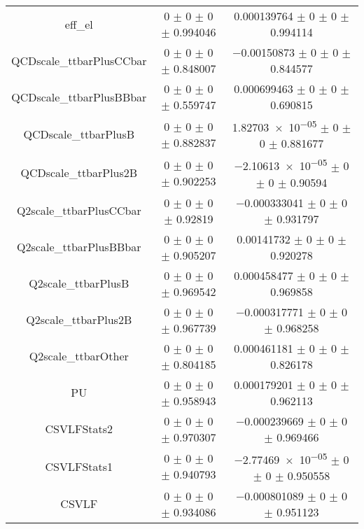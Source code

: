 \begin{table}
\begin{tabular}{ccc}
eff\_el & \num{0} $\pm$ \num{0} $\pm$ \num{0} $\pm$ \num{0.994046} & \num{0.000139764} $\pm$ \num{0} $\pm$ \num{0} $\pm$ \num{0.994114}\\
QCDscale\_ttbarPlusCCbar & \num{0} $\pm$ \num{0} $\pm$ \num{0} $\pm$ \num{0.848007} & \num{-0.00150873} $\pm$ \num{0} $\pm$ \num{0} $\pm$ \num{0.844577}\\
QCDscale\_ttbarPlusBBbar & \num{0} $\pm$ \num{0} $\pm$ \num{0} $\pm$ \num{0.559747} & \num{0.000699463} $\pm$ \num{0} $\pm$ \num{0} $\pm$ \num{0.690815}\\
QCDscale\_ttbarPlusB & \num{0} $\pm$ \num{0} $\pm$ \num{0} $\pm$ \num{0.882837} & \num{1.82703e-05} $\pm$ \num{0} $\pm$ \num{0} $\pm$ \num{0.881677}\\
QCDscale\_ttbarPlus2B & \num{0} $\pm$ \num{0} $\pm$ \num{0} $\pm$ \num{0.902253} & \num{-2.10613e-05} $\pm$ \num{0} $\pm$ \num{0} $\pm$ \num{0.90594}\\
Q2scale\_ttbarPlusCCbar & \num{0} $\pm$ \num{0} $\pm$ \num{0} $\pm$ \num{0.92819} & \num{-0.000333041} $\pm$ \num{0} $\pm$ \num{0} $\pm$ \num{0.931797}\\
Q2scale\_ttbarPlusBBbar & \num{0} $\pm$ \num{0} $\pm$ \num{0} $\pm$ \num{0.905207} & \num{0.00141732} $\pm$ \num{0} $\pm$ \num{0} $\pm$ \num{0.920278}\\
Q2scale\_ttbarPlusB & \num{0} $\pm$ \num{0} $\pm$ \num{0} $\pm$ \num{0.969542} & \num{0.000458477} $\pm$ \num{0} $\pm$ \num{0} $\pm$ \num{0.969858}\\
Q2scale\_ttbarPlus2B & \num{0} $\pm$ \num{0} $\pm$ \num{0} $\pm$ \num{0.967739} & \num{-0.000317771} $\pm$ \num{0} $\pm$ \num{0} $\pm$ \num{0.968258}\\
Q2scale\_ttbarOther & \num{0} $\pm$ \num{0} $\pm$ \num{0} $\pm$ \num{0.804185} & \num{0.000461181} $\pm$ \num{0} $\pm$ \num{0} $\pm$ \num{0.826178}\\
PU & \num{0} $\pm$ \num{0} $\pm$ \num{0} $\pm$ \num{0.958943} & \num{0.000179201} $\pm$ \num{0} $\pm$ \num{0} $\pm$ \num{0.962113}\\
CSVLFStats2 & \num{0} $\pm$ \num{0} $\pm$ \num{0} $\pm$ \num{0.970307} & \num{-0.000239669} $\pm$ \num{0} $\pm$ \num{0} $\pm$ \num{0.969466}\\
CSVLFStats1 & \num{0} $\pm$ \num{0} $\pm$ \num{0} $\pm$ \num{0.940793} & \num{-2.77469e-05} $\pm$ \num{0} $\pm$ \num{0} $\pm$ \num{0.950558}\\
CSVLF & \num{0} $\pm$ \num{0} $\pm$ \num{0} $\pm$ \num{0.934086} & \num{-0.000801089} $\pm$ \num{0} $\pm$ \num{0} $\pm$ \num{0.951123}\\

\end{tabular}
\end{table}
